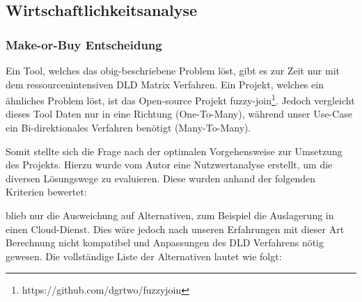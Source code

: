 

\subsection{Wirtschaftlichkeitsanalyse}
\subsubsection{Make-or-Buy Entscheidung}
Ein Tool, welches das obig-beschriebene Problem löst, gibt es zur Zeit nur mit dem
ressourcenintensiven DLD Matrix Verfahren. Ein Projekt, welches ein ähnliches
Problem löst, ist das Open-source Projekt fuzzy-join\footnote{https://github.com/dgrtwo/fuzzyjoin}.
Jedoch vergleicht dieses Tool Daten nur in eine Richtung (One-To-Many), während unser
Use-Case ein Bi-direktionales Verfahren benötigt (Many-To-Many).\par

Somit stellte sich die Frage nach der optimalen Vorgehensweise zur Umsetzung des
Projekts. Hierzu wurde vom Autor eine Nutzwertanalyse erstellt, um die diversen
Lösungswege zu evaluieren. Diese wurden anhand der folgenden Kriterien bewertet:

blieb nur die Ausweichung auf Alternativen, zum Beispiel die Auslagerung in
einen Cloud-Dienst. Dies wäre jedoch nach unseren Erfahrungen mit dieser Art
Berechnung nicht kompatibel und Anpassungen des DLD Verfahrens nötig gewesen.
Die vollständige Liste der Alternativen lautet wie folgt:

